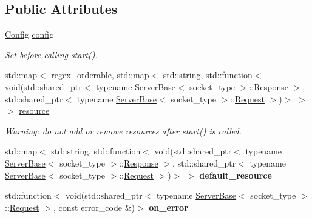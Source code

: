 \subsection*{Public Attributes}
\begin{DoxyCompactItemize}
\item 
\hyperlink{classSimpleWeb_1_1ServerBase_1_1Config}{Config} \hyperlink{classSimpleWeb_1_1ServerBase_a3d4b2de8f6c2d79229c97a67acf67ad6}{config}\hypertarget{classSimpleWeb_1_1ServerBase_a3d4b2de8f6c2d79229c97a67acf67ad6}{}\label{classSimpleWeb_1_1ServerBase_a3d4b2de8f6c2d79229c97a67acf67ad6}

\begin{DoxyCompactList}\small\item\em Set before calling start(). \end{DoxyCompactList}\item 
std\+::map$<$ regex\+\_\+orderable, std\+::map$<$ std\+::string, std\+::function$<$ void(std\+::shared\+\_\+ptr$<$ typename \hyperlink{classSimpleWeb_1_1ServerBase}{Server\+Base}$<$ socket\+\_\+type $>$\+::\hyperlink{classSimpleWeb_1_1ServerBase_1_1Response}{Response} $>$, std\+::shared\+\_\+ptr$<$ typename \hyperlink{classSimpleWeb_1_1ServerBase}{Server\+Base}$<$ socket\+\_\+type $>$\+::\hyperlink{classSimpleWeb_1_1ServerBase_1_1Request}{Request} $>$)$>$ $>$ $>$ \hyperlink{classSimpleWeb_1_1ServerBase_a9cbd951ffa528ddab83352c6654695e3}{resource}\hypertarget{classSimpleWeb_1_1ServerBase_a9cbd951ffa528ddab83352c6654695e3}{}\label{classSimpleWeb_1_1ServerBase_a9cbd951ffa528ddab83352c6654695e3}

\begin{DoxyCompactList}\small\item\em Warning\+: do not add or remove resources after start() is called. \end{DoxyCompactList}\item 
std\+::map$<$ std\+::string, std\+::function$<$ void(std\+::shared\+\_\+ptr$<$ typename \hyperlink{classSimpleWeb_1_1ServerBase}{Server\+Base}$<$ socket\+\_\+type $>$\+::\hyperlink{classSimpleWeb_1_1ServerBase_1_1Response}{Response} $>$, std\+::shared\+\_\+ptr$<$ typename \hyperlink{classSimpleWeb_1_1ServerBase}{Server\+Base}$<$ socket\+\_\+type $>$\+::\hyperlink{classSimpleWeb_1_1ServerBase_1_1Request}{Request} $>$)$>$ $>$ {\bfseries default\+\_\+resource}\hypertarget{classSimpleWeb_1_1ServerBase_aba7325dbe6c66f5f715e1a279031aec1}{}\label{classSimpleWeb_1_1ServerBase_aba7325dbe6c66f5f715e1a279031aec1}

\item 
std\+::function$<$ void(std\+::shared\+\_\+ptr$<$ typename \hyperlink{classSimpleWeb_1_1ServerBase}{Server\+Base}$<$ socket\+\_\+type $>$\+::\hyperlink{classSimpleWeb_1_1ServerBase_1_1Request}{Request} $>$, const error\+\_\+code \&)$>$ {\bfseries on\+\_\+error}\hypertarget{classSimpleWeb_1_1ServerBase_a7a2719f083383c32dee1f031358ca0f8}{}\label{classSimpleWeb_1_1ServerBase_a7a2719f083383c32dee1f031358ca0f8}


\end{DoxyCompactItemize}
